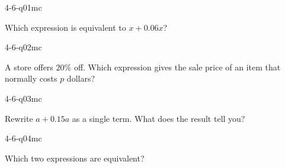 

\begin{practiceQuestion}{4-6-q01}{mc}
\begin{questionText}
Which expression is equivalent to $x + 0.06x$?
\end{questionText}
\end{practiceQuestion}

\begin{practiceQuestion}{4-6-q02}{mc}
\begin{questionText}
A store offers $20\%$ off. Which expression gives the sale price of an item that normally costs $p$ dollars?
\end{questionText}
\end{practiceQuestion}

\begin{practiceQuestion}{4-6-q03}{mc}
\begin{questionText}
Rewrite $a + 0.15a$ as a single term. What does the result tell you?
\end{questionText}
\end{practiceQuestion}

\begin{practiceQuestion}{4-6-q04}{mc}
\begin{questionText}
Which two expressions are equivalent?
\end{questionText}
\end{practiceQuestion}

